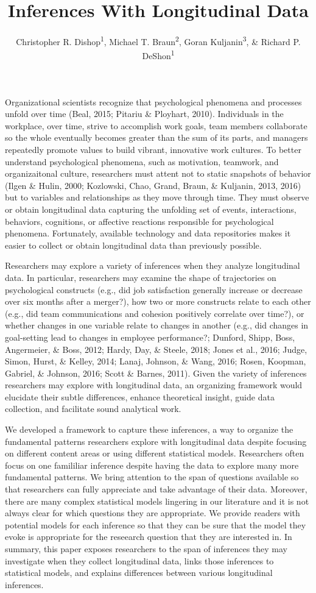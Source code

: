 \documentclass[english,,man]{apa6}
\title{Inferences With Longitudinal Data}
\author{Christopher R. Dishop\textsuperscript{1}, Michael T.
Braun\textsuperscript{2}, Goran Kuljanin\textsuperscript{3}, \& Richard
P. DeShon\textsuperscript{1}}
\date{}
\affiliation{
\vspace{0.5cm}
\textsuperscript{1} Michigan State University\\\textsuperscript{2} University of South Florida\\\textsuperscript{3} DePaul University}
\theoremstyle{definition}
\theoremstyle{definition}
\theoremstyle{definition}
\theoremstyle{remark}
\begin{document}
\maketitle

Organizational scientists recognize that psychological phenomena and
processes unfold over time (Beal, 2015; Pitariu \& Ployhart, 2010).
Individuals in the workplace, over time, strive to accomplish work
goals, team members collaborate so the whole eventually becomes greater
than the sum of its parts, and managers repeatedly promote values to
build vibrant, innovative work cultures. To better understand
psychological phenomena, such as motivation, teamwork, and
organizaitonal culture, researchers must attent not to static snapshots
of behavior (Ilgen \& Hulin, 2000; Kozlowski, Chao, Grand, Braun, \&
Kuljanin, 2013, 2016) but to variables and relationships as they move
through time. They must observe or obtain longitudinal data capturing
the unfolding set of events, interactions, behaviors, cognitions, or
affective reactions responsible for psychological phenomena.
Fortunately, available technology and data repositories makes it easier
to collect or obtain longitudinal data than previously possible.

Researchers may explore a variety of inferences when they analyze
longitudinal data. In particular, researchers may examine the shape of
trajectories on psychological constructs (e.g., did job satisfaction
generally increase or decrease over six months after a merger?), how two
or more constructs relate to each other (e.g., did team communications
and cohesion positively correlate over time?), or whether changes in one
variable relate to changes in another (e.g., did changes in goal-setting
lead to changes in employee performance?; Dunford, Shipp, Boss,
Angermeier, \& Boss, 2012; Hardy, Day, \& Steele, 2018; Jones et al.,
2016; Judge, Simon, Hurst, \& Kelley, 2014; Lanaj, Johnson, \& Wang,
2016; Rosen, Koopman, Gabriel, \& Johnson, 2016; Scott \& Barnes, 2011).
Given the variety of inferences researchers may explore with
longitudinal data, an organizing framework would elucidate their subtle
differences, enhance theoretical insight, guide data collection, and
facilitate sound analytical work.

We developed a framework to capture these inferences, a way to organize
the fundamental patterns researchers explore with longitudinal data
despite focusing on different content areas or using different
statistical models. Researchers often focus on one famililiar inference
despite having the data to explore many more fundamental patterns. We
bring attention to the span of questions available so that researchers
can fully appreciate and take advantage of their data. Moreover, there
are many complex statistical models lingering in our literature and it
is not always clear for which questions they are appropriate. We provide
readers with potential models for each inference so that they can be
sure that the model they evoke is appropriate for the reseearch question
that they are interested in. In summary, this paper exposes researchers
to the span of inferences they may investigate when they collect
longitudinal data, links those inferences to statistical models, and
explains differences between various longitudinal inferences.
\end{document}
